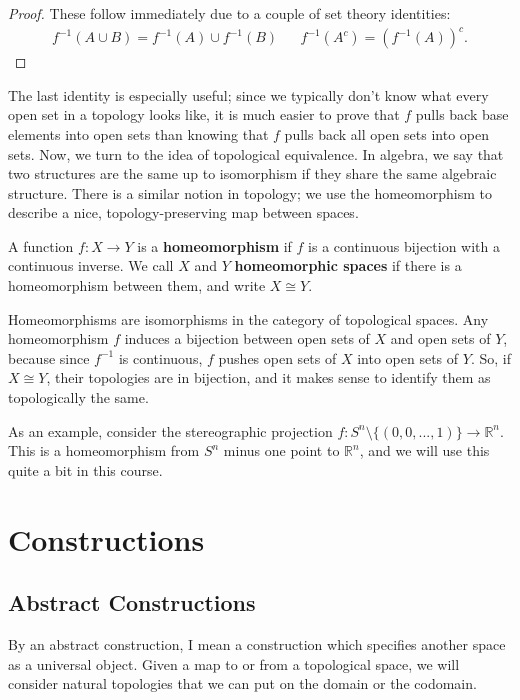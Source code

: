 	\begin{proof}
		These follow immediately due to a couple of set theory identities:
		\begin{align}
			f^{-1}(A\cup B) = f^{-1}(A)\cup f^{-1}(B) &&
			f^{-1}(A^c) = (f^{-1}(A))^c.
		\end{align}
	\end{proof}
	
	The last identity is especially useful; since we typically don't know what every open set in a topology looks like, it is much easier to prove that $f$ pulls back 
	base elements into open sets than knowing that $f$ pulls back all open sets into open sets. Now, we turn to the idea of topological equivalence. In 
	algebra, we say that two structures are the same up to isomorphism if they share the same algebraic structure. There is a similar notion in topology; 
	we use the homeomorphism to describe a nice, topology-preserving map between spaces.
	
	\begin{definition}[Homeomorphism]
		A function $f : X\rightarrow Y$ is a \textbf{homeomorphism} if $f$ is a continuous bijection with a continuous inverse. We call $X$ and $Y$ \textbf{
		homeomorphic spaces} if there is a homeomorphism between them, and write $X\cong Y$.
	\end{definition}
	
	Homeomorphisms are isomorphisms in the category of topological spaces. Any homeomorphism $f$ induces a bijection between open sets of $X$ and open 
	sets of $Y$, because since $f^{-1}$ is continuous, $f$ pushes open sets of $X$ into open sets of $Y$. So, if $X\cong Y$, their topologies are in bijection, and it 
	makes sense to identify them as topologically the same.
	
	As an example, consider the stereographic projection $f : S^n\setminus\{(0, 0, ..., 1)\}\rightarrow \mathbb R^n$. This is a homeomorphism from $S^n$ 
	minus one point to $\mathbb R^n$, and we will use this quite a bit in this course.
	
	
\section{Constructions}

	\subsection{Abstract Constructions}
	
	By an abstract construction, I mean a construction which specifies another space as a universal object. Given a map to or from a topological space, we will 
	consider natural topologies that we can put on the domain or the codomain. 
	
